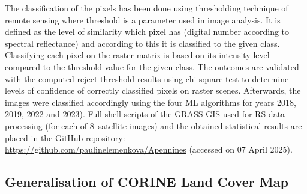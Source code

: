\documentclass[jimaging,article,accept,pdftex,oneauthor]{Definitions/mdpi}
\begin{document}
The classification of the pixels has been done using thresholding technique of remote sensing where threshold is a parameter used in image analysis. It is defined as the level of similarity which pixel has (digital number according to spectral reflectance) and according to this it is classified to the given class. Classifying each pixel on the raster matrix is based on its intensity level compared to the threshold value for the given class. The outcomes are validated with the computed reject threshold results using chi %
square test to determine levels of confidence of correctly classified pixels on raster scenes. Afterwards, the images were classified accordingly {using the four ML algorithms for years} {2018}, 2019, 2022 and 2023{). }Full shell scripts of the GRASS GIS used for RS data processing (for each of 8~satellite images) and the obtained statistical results are placed in the GitHub repository: \href{https://github.com/paulinelemenkova/Apennines}{https://github.com/paulinelemenkova/Apennines} (accessed on 07 April 2025). %

\subsection{{Generalisation of CORINE Land Cover Map}}

\end{document}

